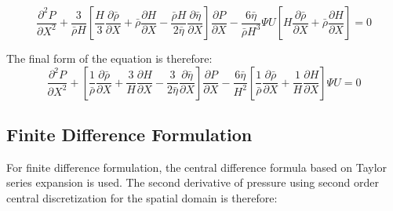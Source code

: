 \begin{equation}\label{eq1.13}
	\frac{\partial^{2} P}{\partial X^{2}}+\frac{3}{\bar{\rho} H}\left[\frac{H}{3} \frac{\partial \bar{\rho}}{\partial X}+\bar{\rho} \frac{\partial H}{\partial X}-\frac{\bar{\rho} H}{2 \bar{\eta}} \frac{\partial \bar{\eta}}{\partial X}\right] \frac{\partial P}{\partial X}-\frac{6 \bar{\eta}}{\bar{\rho} H^{3}} \Psi U\left[H \frac{\partial \bar{\rho}}{\partial X}+\bar{\rho} \frac{\partial H}{\partial X}\right]=0
\end{equation}

The final form of the equation is therefore:
\begin{equation}\label{eq1.14}
	\frac{\partial^{2} P}{\partial X^{2}}+\left[\frac{1}{\bar{\rho}} \frac{\partial \bar{\rho}}{\partial X}+\frac{3}{H} \frac{\partial H}{\partial X}-\frac{3}{2 \bar{\eta}} \frac{\partial \bar{\eta}}{\partial X}\right] \frac{\partial P}{\partial X}-\frac{6 \bar{\eta}}{H^{2}}\left[\frac{1}{\bar{\rho}} \frac{\partial \bar{\rho}}{\partial X}+\frac{1}{H} \frac{\partial H}{\partial X}\right] \Psi U=0
\end{equation}

\subsection{Finite Difference Formulation}

For finite difference formulation, the central difference formula based on Taylor series expansion \cite{Hoffmann2000} is used. The second derivative of pressure using second order central discretization for the spatial domain is therefore:
